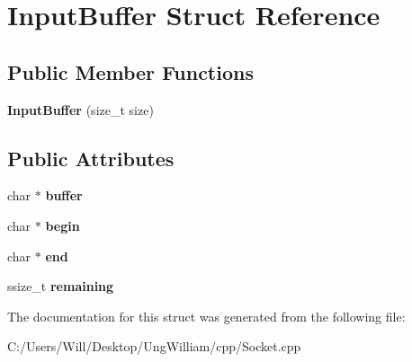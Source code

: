 \hypertarget{struct_input_buffer}{}\section{Input\+Buffer Struct Reference}
\label{struct_input_buffer}
\subsection*{Public Member Functions}
\begin{DoxyCompactItemize}
\item 
{\bfseries Input\+Buffer} (size\+\_\+t size)\hypertarget{struct_input_buffer_a9409ec8e4581caa99dcac1af963349b5}{}\label{struct_input_buffer_a9409ec8e4581caa99dcac1af963349b5}

\end{DoxyCompactItemize}
\subsection*{Public Attributes}
\begin{DoxyCompactItemize}
\item 
char $\ast$ {\bfseries buffer}\hypertarget{struct_input_buffer_aee7a717b6cf023deabe9910410e6cfb6}{}\label{struct_input_buffer_aee7a717b6cf023deabe9910410e6cfb6}

\item 
char $\ast$ {\bfseries begin}\hypertarget{struct_input_buffer_a2f05121c4fb8571845cc22d083c6da46}{}\label{struct_input_buffer_a2f05121c4fb8571845cc22d083c6da46}

\item 
char $\ast$ {\bfseries end}\hypertarget{struct_input_buffer_a52ba71c71b9b955b8369fc5217e3c4b6}{}\label{struct_input_buffer_a52ba71c71b9b955b8369fc5217e3c4b6}

\item 
ssize\+\_\+t {\bfseries remaining}\hypertarget{struct_input_buffer_a621d633184a77c449e7b07d705870ae2}{}\label{struct_input_buffer_a621d633184a77c449e7b07d705870ae2}

\end{DoxyCompactItemize}


The documentation for this struct was generated from the following file\+:\begin{DoxyCompactItemize}
\item 
C\+:/\+Users/\+Will/\+Desktop/\+Ung\+William/cpp/Socket.\+cpp\end{DoxyCompactItemize}
